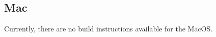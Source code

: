 \documentclass[a4paper,10pt]{article}
\begin{document}
\subsection{Mac}
Currently, there are no build instructions available for the MacOS.
%
\clearpage

%

\end{document}
